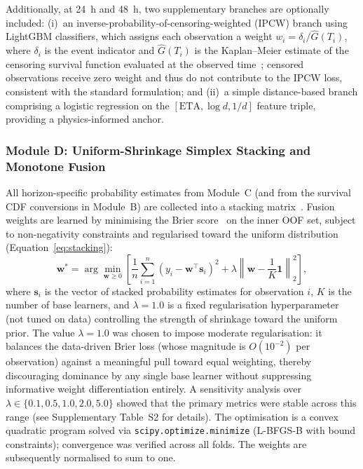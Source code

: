 \documentclass[fire,article,submit,pdftex]{../Definitions/mdpi}
\begin{document}
Additionally, at 24~h and 48~h, two supplementary branches are optionally included:
(i)~an inverse-probability-of-censoring-weighted (IPCW) branch using LightGBM classifiers, which assigns each observation a weight $w_i = \delta_i / \hat{G}(T_i)$, where $\delta_i$ is the event indicator and $\hat{G}(T_i)$ is the Kaplan--Meier estimate of the censoring survival function evaluated at the observed time~\cite{Uno2011,Graf1999}; censored observations receive zero weight and thus do not contribute to the IPCW loss, consistent with the standard formulation; and
(ii)~a simple distance-based branch comprising a logistic regression on the $[\text{ETA}, \log d, 1/d]$ feature triple, providing a physics-informed anchor.

\subsubsection{Module D: Uniform-Shrinkage Simplex Stacking and Monotone Fusion}

All horizon-specific probability estimates from Module~C (and from the survival CDF conversions in Module~B) are collected into a stacking matrix~\cite{Wolpert1992,VanderLaan2007}.
Fusion weights are learned by minimising the Brier score~\cite{Brier1950} on the inner OOF set, subject to non-negativity constraints and regularised toward the uniform distribution (Equation~\eqref{eq:stacking}):
\begin{equation}
    \mathbf{w}^* = \arg\min_{\mathbf{w} \geq 0} \left[ \frac{1}{n} \sum_{i=1}^{n} \left( y_i - \mathbf{w}^\top \mathbf{s}_i \right)^2 + \lambda \left\| \mathbf{w} - \frac{1}{K}\mathbf{1} \right\|_2^2 \right],
    \label{eq:stacking}
\end{equation}
where $\mathbf{s}_i$ is the vector of stacked probability estimates for observation $i$, $K$ is the number of base learners, and $\lambda = 1.0$ is a fixed regularisation hyperparameter (not tuned on data) controlling the strength of shrinkage toward the uniform prior.
The value $\lambda = 1.0$ was chosen to impose moderate regularisation: it balances the data-driven Brier loss (whose magnitude is $O(10^{-2})$ per observation) against a meaningful pull toward equal weighting, thereby discouraging dominance by any single base learner without suppressing informative weight differentiation entirely.
A sensitivity analysis over $\lambda \in \{0.1, 0.5, 1.0, 2.0, 5.0\}$ showed that the primary metrics were stable across this range (see Supplementary Table~S2 for details).
The optimisation is a convex quadratic program solved via \texttt{scipy.optimize.minimize} (L-BFGS-B with bound constraints); convergence was verified across all folds.
The weights are subsequently normalised to sum to one.
\end{document}

